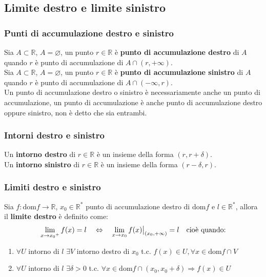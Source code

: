 \documentclass[a4paper]{article}
\newcommand\restr[2]{{%
	\left.\kern-\nulldelimiterspace %
	#1 %
	\vphantom{\big|} %
	\right|_{#2} %
	}}
\newcommand\dom{\text{dom}}
\begin{document}
\subsection{Limite destro e limite sinistro}
\subsubsection*{Punti di accumulazione destro e sinistro}
Sia \(A \subset \mathbb{R}\), \(A = \varnothing\), un punto \(r \in \mathbb{R}\) è \textbf{punto di accumulazione destro} di \(A\) quando \(r\) è punto di accumulazione di \(A \cap \left( r, + \infty \right)\). \\
Sia \(A \subset \mathbb{R}\), \(A = \varnothing\), un punto \(r \in \mathbb{R}\) è \textbf{punto di accumulazione sinistro} di \(A\) quando \(r\) è punto di accumulazione di \(A \cap \left( - \infty, r \right)\). \\
Un punto di accumulazione destro o sinistro è necessariamente anche un punto di accumulazione,
un punto di accumulazione è anche punto di accumulazione destro oppure sinistro, non è detto che sia entrambi.

\subsubsection*{Intorni destro e sinistro}
Un \textbf{intorno destro} di \(r \in \mathbb{R}\) è un insieme della forma \(\left( r, r + \delta \right)\). \\
Un \textbf{intorno sinistro} di \(r \in \mathbb{R}\) è un insieme della forma \(\left( r - \delta, r \right)\).

\subsubsection*{Limiti destro e sinistro}
Sia \(f: \dom f \to \mathbb{R}\), \(x_0 \in \mathbb{R}^*\) punto di accumulazione destro di \(\dom f\) e \(l \in \mathbb{R}^*\), allora il \textbf{limite destro} è definito come:
\[\lim_{x \to {x_0}^+} f(x) = l \quad \Leftrightarrow \quad \lim_{x \to {x_0}} \restr{f(x)}{\left( x_0, + \infty \right)} = l \quad \text{cioè quando:}\]
\begin{enumerate}
	\item \(\forall U\) intorno di \(l\) \(\exists V\) intorno destro di \(x_0\) t.c. \(f(x) \in U, \forall x \in \dom f \cap V\)
	\item \(\forall U\) intorno di \(l\) \(\exists \delta > 0\) t.c. \(\forall x \in \dom f \cap \left( x_0, x_0 + \delta \right) \Rightarrow f(x) \in U\)
\end{enumerate}
\end{document}
